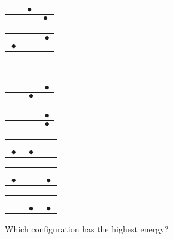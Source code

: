 \begin{frame}[t]
\begin{center}
\begin{tabular}{|c|c|c|}
  \hline
  \end{tabular}
  \begin{tabular}{|c|c|c|}
  \hline
  $\phantom{\bullet}$ & $\bullet$ & $\phantom{\bullet}$ \\ \hline
  &  & $\bullet$ \\
  \hline
  \end{tabular}
  \begin{tabular}{|c|c|c|}
  \hline
  $\phantom{\bullet}$ & $\phantom{\bullet}$ & $\bullet$ \\ \hline
  $\bullet$ &  &  \\
  \hline
  \end{tabular} \\
  \vspace{0.5em}
  \begin{tabular}{|c|c|c|}
  \hline
  $\phantom{\bullet}$ & $\phantom{\bullet}$ & $\bullet$ \\ \hline
  & $\bullet$ &  \\
  \hline
  \end{tabular}
  \begin{tabular}{|c|c|c|}
  \hline
  $\phantom{\bullet}$ & $\phantom{\bullet}$ & $\bullet$ \\ \hline
  &  & $\bullet$ \\
  \hline
  \end{tabular}
  \begin{tabular}{|c|c|c|}
  \hline
  $\phantom{\bullet}$ & $\phantom{\bullet}$ & $\phantom{\bullet}$ \\ \hline
  $\bullet$ & $\bullet$ &  \\
  \hline
  \end{tabular}
  \begin{tabular}{|c|c|c|}
  \hline
  $\phantom{\bullet}$ & $\phantom{\bullet}$ & $\phantom{\bullet}$ \\ \hline
  $\bullet$ &  & $\bullet$ \\
  \hline
  \end{tabular}
  \begin{tabular}{|c|c|c|}
  \hline
  $\phantom{\bullet}$ & $\phantom{\bullet}$ & $\phantom{\bullet}$ \\ \hline
  & $\bullet$ & $\bullet$ \\
  \hline
  \end{tabular}
  \end{center}
  Which configuration has the highest energy?
  

\end{frame}
